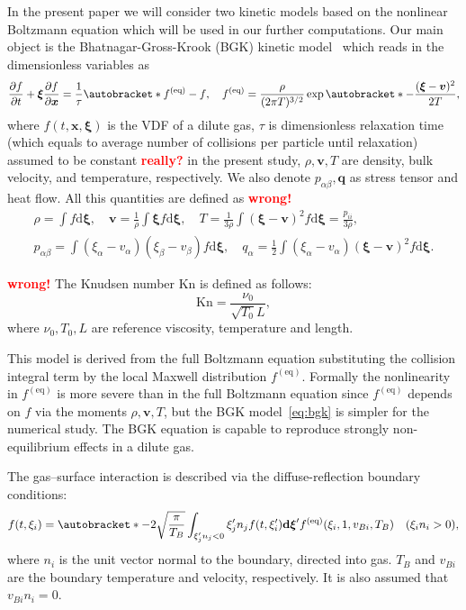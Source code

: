 \documentclass[]{elsarticle} %
\newcommand{\alert}[1]{\textcolor{red}{\large \bf #1}}
\newcommand{\Kn}{\mathrm{Kn}}
\newcommand{\dd}{\mathrm{d}}
\newcommand{\pder}[2][]{\frac{\partial#1}{\partial#2}}
\DeclarePairedDelimiter\autobracket()       %
\newcommand{\br}[1]{\autobracket*{#1}}
\newcommand{\dxi}{\boldsymbol{\dd\xi}}
\newcommand{\bxi}{\boldsymbol{\xi}}
\newcommand{\bv}{\boldsymbol{v}}
\newcommand{\bq}{\boldsymbol{q}}
\newcommand{\bx}{\boldsymbol{x}}
\newcommand{\equil}[1]{#1^\mathrm{(eq)}}
\newcommand{\refer}[1]{#1_0}
\begin{document}
{In the present paper we will consider two kinetic models based on the nonlinear Boltzmann equation which will be used in our further computations.
Our main object is the Bhatnagar-Gross-Krook (BGK) kinetic model~\cite{Krook1954, Welander1954} which reads in the dimensionless variables as
\begin{equation}\label{eq:bgk}
    \pder[f]{t} + \bxi\pder[f]{\bx} = \frac1\tau\br{\equil{f}-f}, \quad
    \equil{f} = \frac{\rho}{(2\pi T)^{3/2}}\exp\br{ -\frac{(\bxi-\bv)^2}{2T} },
\end{equation}
where $f(t,\bx,\bxi)$ is the VDF of a dilute gas, $\tau$ is dimensionless relaxation time
(which equals to average number of collisions per particle until relaxation)
assumed to be constant \alert{really?} in the present study, $\rho,\bv,T$ are density, bulk velocity, and temperature, respectively.
We also denote $p_{\alpha \beta}, \bq$ as stress tensor and heat flow.
All this quantities are defined as
\alert{wrong!}
\begin{equation}\label{eq:macro}
    \begin{gathered}
    \rho = \int f \dxi, \quad
    \bv = \frac1{\rho} \int \bxi f \dxi, \quad
    T = \frac{1}{3\rho}\int(\bxi-\bv)^2f \dxi = \frac{p_{ii}}{3\rho}, \\
    p_{\alpha \beta} = \int(\xi_{\alpha}-v_{\alpha})(\xi_{\beta}-v_{\beta}) f \dxi, \quad
    q_{\alpha} = \frac{1}{2}\int(\xi_{\alpha}-v_{\alpha})(\bxi-\bv)^2 f \dxi.
    \end{gathered}
\end{equation}

\alert{wrong!}
The Knudsen number \(\Kn\) is defined as follows:
\begin{equation}\label{eq:Knudsen_number}
   \Kn = \frac{\refer\nu }{\sqrt{T_0} L},
\end{equation}
where $\refer\nu, T_0, L $ are reference viscosity, temperature and length.

This model is derived from the full Boltzmann equation substituting the collision integral term by the local Maxwell distribution $\equil{f}$.
Formally the nonlinearity in $\equil{f}$ is more severe than in the full Boltzmann equation since $\equil{f}$ depends on $f$
via the moments $\rho,\bv,T$, but the BGK model~\eqref{eq:bgk} is simpler for the numerical study.
The BGK equation is capable to reproduce strongly non-equilibrium effects in a dilute gas.

The gas--surface interaction is described via the diffuse-reflection boundary conditions:
\begin{equation}\label{eq:diffuse}
    f(t,\xi_i) = \br{-2\sqrt\frac\pi{T_B} \int_{\xi'_jn_j<0}\xi'_jn_jf(t,\xi'_i)\dxi'}
        \equil{f}(\xi_i,1,v_{Bi},T_B) \quad (\xi_in_i>0),
\end{equation}
where \(n_i\) is the unit vector normal to the boundary, directed into gas.
\(T_B\) and \(v_{Bi}\) are the boundary temperature and velocity, respectively.
It is also assumed that \(v_{Bi}n_i = 0\).

}
\end{document}
